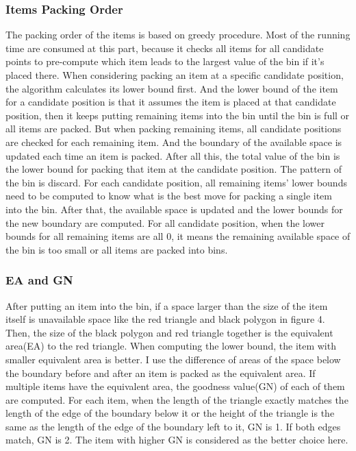 \documentclass[11pt]{article}
\begin{document}
        \subsubsection{Items Packing Order}
        The packing order of the items is based on greedy procedure. Most of the running time are consumed at this part, because it checks all items for all candidate points to pre-compute which item leads to the largest value of the bin if it's placed there.
        \newline
        When considering packing an item at a specific candidate position, the algorithm calculates its lower bound first. And the lower bound of the item for a candidate position is that it assumes the item is placed at that candidate position, then it keeps putting remaining items into the bin until the bin is full or all items are packed. But when packing remaining items, all candidate positions are checked for each remaining item. And the boundary of the available space is updated each time an item is packed. After all this, the total value of the bin is the lower bound for packing that item at the candidate position. The pattern of the bin is discard.
        \newline
        For each candidate position, all remaining items' lower bounds need to be computed to know what is the best move for packing a single item into the bin. After that, the available space is updated and the lower bounds for the new boundary are computed.
        \newline
        For all candidate position, when the lower bounds for all remaining items are all 0, it means the remaining available space of the bin is too small or all items are packed into bins.
        \subsubsection{EA and GN}
        After putting an item into the bin, if a space larger than the size of the item itself is unavailable space like the red triangle and black polygon in figure 4. Then, the size of the black polygon and red triangle together is the equivalent area(EA) to the red triangle.
        \newline
        When computing the lower bound, the item with smaller equivalent area is better. I use the difference of areas of the space below the boundary before and after an item is packed as the equivalent area.
        \newline
        If multiple items have the equivalent area, the goodness value(GN) of each of them are computed. For each item, when the length of the triangle exactly matches the length of the edge of the boundary below it or the height of the triangle is the same as the length of the edge of the boundary left to it, GN is 1. If both edges match, GN is 2. The item with higher GN is considered as the better choice here.
\end{document}
